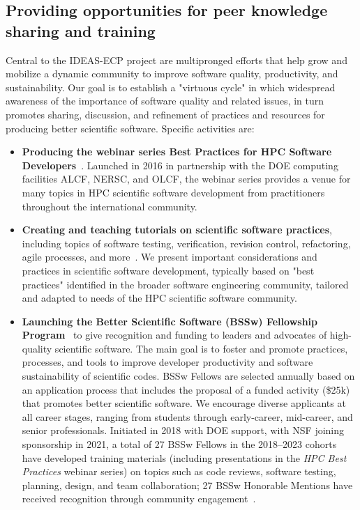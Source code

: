 \subsection*{Providing opportunities for peer knowledge sharing and training}
Central to the IDEAS-ECP project are multipronged efforts that help grow and mobilize a dynamic community to improve software quality, productivity, and sustainability. Our goal is to establish a "virtuous cycle" in which widespread awareness of the importance of software quality and related issues, in turn promotes sharing, discussion, and refinement of practices and resources for producing better scientific software. Specific activities are: 

\begin{itemize}
\item  {\bf Producing the webinar series Best Practices for HPC Software Developers}~\cite{www:hpcbp,BPHTE18-HPC-BP,repo:webinar-process,hpcbp-first-five-years2021}.  Launched in 2016 in partnership with the DOE computing facilities ALCF, NERSC, and OLCF, the webinar series provides a venue for many topics in HPC scientific software development from practitioners throughout the international community.

\item {\bf Creating and teaching tutorials on scientific software practices}, including topics of software testing, verification, revision control,  refactoring, agile processes, and more~\cite{www:bssw-tutorial}. We present important considerations and practices in scientific software development, typically based on "best practices" identified in the broader software engineering community, tailored and adapted to needs of the HPC scientific software community. 

\item {\bf Launching the Better Scientific Software (BSSw) Fellowship Program}~\cite{www:bsswf} to give recognition and funding to leaders and advocates of high-quality scientific software.
The main goal is to foster and promote practices, processes, and tools to improve developer productivity and software sustainability of scientific codes. BSSw Fellows are selected annually based on an application process that includes the proposal of a funded activity (\$25k) that promotes better scientific software.  We encourage diverse applicants at all career stages, ranging from students through early-career, mid-career, and senior professionals. Initiated in 2018 with DOE support, with NSF joining sponsorship in 2021, a total of 27 BSSw Fellows in the 2018--2023 cohorts have developed training materials (including presentations in the {\em HPC Best Practices} webinar series) on topics such as code reviews, software testing, planning, design, and team collaboration; 27 BSSw Honorable Mentions have received recognition through community engagement~\cite{www:bsswf-mof}.
 

\end{itemize}
